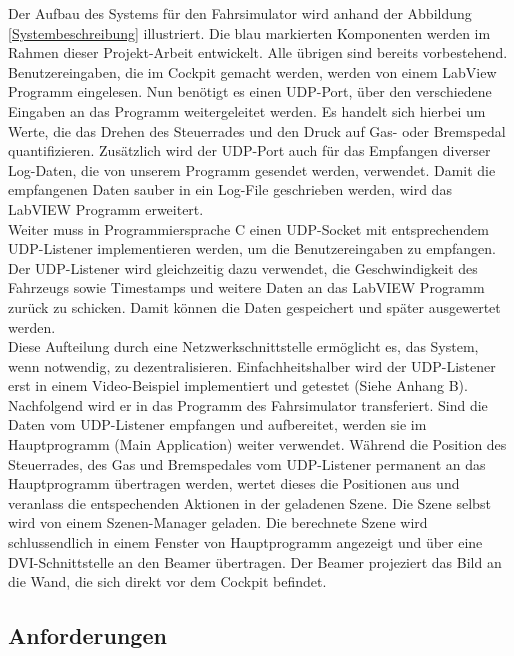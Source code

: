 Der Aufbau des Systems für den Fahrsimulator wird anhand der Abbildung \ref{Systembeschreibung} illustriert. Die blau markierten Komponenten werden im Rahmen dieser Projekt-Arbeit entwickelt. Alle übrigen sind bereits vorbestehend. \\
Benutzereingaben, die im Cockpit gemacht werden, werden von einem LabView Programm eingelesen. Nun benötigt es einen UDP-Port,  über den verschiedene Eingaben an das Programm weitergeleitet werden. Es handelt sich hierbei um Werte, die das Drehen des Steuerrades und den Druck auf Gas- oder Bremspedal quantifizieren. Zusätzlich wird der UDP-Port auch für das Empfangen diverser Log-Daten, die von unserem Programm gesendet werden, verwendet. Damit die empfangenen Daten sauber in ein Log-File geschrieben werden, wird das LabVIEW Programm erweitert. \\
Weiter  muss in Programmiersprache C einen UDP-Socket mit entsprechendem UDP-Listener implementieren werden, um die Benutzereingaben zu empfangen. Der UDP-Listener wird gleichzeitig dazu verwendet, die Geschwindigkeit des Fahrzeugs sowie Timestamps und weitere Daten an das LabVIEW Programm zurück zu schicken. Damit können die Daten gespeichert und später ausgewertet werden.
\\
Diese Aufteilung durch eine Netzwerkschnittstelle ermöglicht es,  das System, wenn notwendig, zu dezentralisieren. Einfachheitshalber wird der UDP-Listener erst in einem Video-Beispiel implementiert und getestet (Siehe Anhang B). Nachfolgend wird er in das Programm des Fahrsimulator transferiert.
Sind die Daten vom UDP-Listener empfangen und aufbereitet, werden sie im Hauptprogramm (Main Application) weiter verwendet. Während die Position des Steuerrades, des Gas und Bremspedales vom UDP-Listener permanent an das Hauptprogramm übertragen werden, wertet dieses die Positionen aus und veranlass die entspechenden Aktionen in der geladenen Szene. 
Die Szene selbst wird von einem Szenen-Manager geladen. Die berechnete Szene wird schlussendlich in einem Fenster von Hauptprogramm angezeigt und über eine DVI-Schnittstelle an den Beamer übertragen. Der Beamer projeziert das Bild an die Wand, die sich direkt vor dem Cockpit befindet. 

\subsection{Anforderungen}
